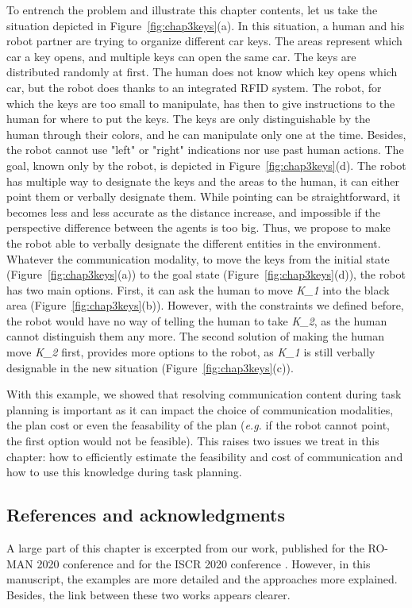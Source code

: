 \documentclass[a4paper,11pt,twoside]{StyleThese}
\begin{document}
To entrench the problem and illustrate this chapter contents, let us take the situation depicted in Figure~\ref{fig:chap3keys}(a). In this situation, a human and his robot partner are trying to organize different car keys. The areas represent which car a key opens, and multiple keys can open the same car. The keys are distributed randomly at first. The human does not know which key opens which car, but the robot does thanks to an integrated RFID system. The robot, for which the keys are too small to manipulate, has then to give instructions to the human for where to put the keys. The keys are only distinguishable by the human through their colors, and he can manipulate only one at the time. Besides, the robot cannot use "left" or "right" indications nor use past human actions.
The goal, known only by the robot, is depicted in Figure~\ref{fig:chap3keys}(d). The robot has multiple way to designate the keys and the areas to the human, it can either point them or verbally designate them. While pointing can be straightforward, it becomes less and less accurate as the distance increase, and impossible if the perspective difference between the agents is too big. Thus, we propose to make the robot able to verbally designate the different entities in the environment.
Whatever the communication modality, to move the keys from the initial state (Figure~\ref{fig:chap3keys}(a)) to the goal state (Figure~\ref{fig:chap3keys}(d)), the robot has two main options. First, it can ask the human to move \textit{K\_1} into the black area (Figure~\ref{fig:chap3keys}(b)). However, with the constraints we defined before, the robot would have no way of telling the human to take \textit{K\_2}, as the human cannot distinguish them any more. The second solution of making the human move \textit{K\_2} first, provides more options to the robot, as \textit{K\_1} is still verbally designable in the new situation (Figure~\ref{fig:chap3keys}(c)).

With this example, we showed that resolving communication content during task planning is important as it can impact the choice of communication modalities, the plan cost or even the feasability of the plan (\textit{e.g.} if the robot cannot point, the first option would not be feasible). This raises two issues we treat in this chapter: how to efficiently estimate the feasibility and cost of communication and how to use this knowledge during task planning.

\subsection{References and acknowledgments}
A large part of this chapter is excerpted from our work, published for the RO-MAN 2020 conference\cite{buisan2020efficient} and for the ISCR 2020 conference \cite{buisan2020human}. However, in this manuscript, the examples are more detailed and the approaches more explained. Besides, the link between these two works appears clearer.
\end{document}
